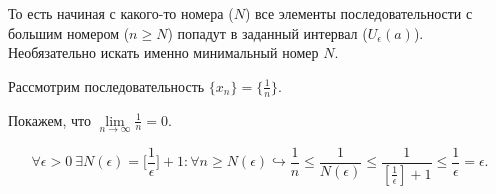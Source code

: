 \begin{note}
    То есть начиная с какого-то номера ($N$) все элементы последовательности с большим номером ($n \geq N$) попадут в заданный интервал ($U_{\epsilon}(a)$). Необязательно искать именно минимальный номер $N$.
\end{note}
\begin{example}
    Рассмотрим последовательность $\{ x_{n} \} = \{ \frac{1}{n} \}.$
    
    Покажем, что $\lim\limits_{n\to \infty} \frac{1}{n} = 0.$

    $$\forall \epsilon > 0 \  \exists N(\epsilon) = \bigg[ \frac{1}{\epsilon} \bigg] + 1: \forall n \geq N(\epsilon) \hookrightarrow \frac{1}{n} \leq \frac{1}{N(\epsilon)} \leq \frac{1}{[ \frac{1}{\epsilon}] + 1} \leq \frac{1}{\epsilon} = \epsilon.$$
     
\end{example}
